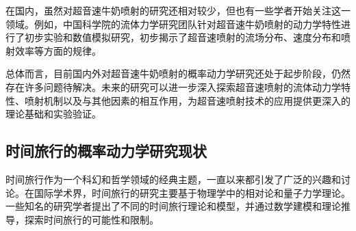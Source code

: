 在国内，虽然对超音速牛奶喷射的研究还相对较少，但也有一些学者开始关注这一领域。例如，中国科学院的流体力学研究团队针对超音速牛奶喷射的动力学特性进行了初步实验和数值模拟研究，初步揭示了超音速喷射的流场分布、速度分布和喷射效率等方面的规律。

总体而言，目前国内外对超音速牛奶喷射的概率动力学研究还处于起步阶段，仍然存在许多问题待解决。未来的研究可以进一步深入探索超音速喷射的流体动力学特性、喷射机制以及与其他因素的相互作用，为超音速喷射技术的应用提供更深入的理论基础和实验验证。

\subsection{时间旅行的概率动力学研究现状}
时间旅行作为一个科幻和哲学领域的经典主题，一直以来都引发了广泛的兴趣和讨论。在国际学术界，时间旅行的研究主要基于物理学中的相对论和量子力学理论。一些知名的研究学者提出了不同的时间旅行理论和模型，并通过数学建模和理论推导，探索时间旅行的可能性和限制。

